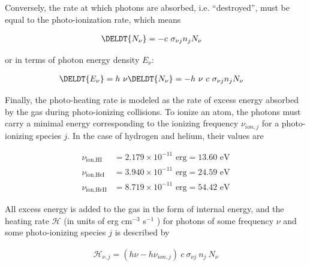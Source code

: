 Conversely, the rate at which photons are absorbed, i.e. ``destroyed'',  must be equal to the
photo-ionization rate, which means

\begin{align}
\DELDT{N_\nu} &= -c \ \sigma_{\nu j} n_j N_\nu
\end{align}

or in terms of photon energy density $E_\nu$:

\begin{align}
\DELDT{E_\nu} &= h \ \nu \DELDT{N_\nu}  = -h\ \nu \ c \ \sigma_{\nu j} n_j N_\nu
\end{align}



Finally, the photo-heating rate is modeled as the rate of excess energy absorbed by the gas during
photo-ionizing collisions. To ionize an atom, the photons must carry a minimal energy corresponding to the ionizing frequency  $\nu_{ion,j}$ for a photo-ionizing species $j$. In the case of hydrogen and helium, their values are

\begin{align}
    \nu_{\text{ion,HI}} &= 2.179 \times 10^{-11} \text{ erg} = 13.60 \text{ eV} \label{eq:nuIonHI}\\
    \nu_{\text{ion,HeI}} &= 3.940 \times 10^{-11} \text{ erg} = 24.59 \text{ eV}
\label{eq:nuIonHeI}\\
    \nu_{\text{ion,HeII}} &= 8.719 \times 10^{-11} \text{ erg} = 54.42 \text{ eV}
\label{eq:nuIonHeII}
\end{align}

All excess energy is added to the gas in the form of internal energy, and the heating rate
$\mathcal{H}$ (in units of erg cm$^{-3}$ s$^{-1}$ ) for photons of some frequency $\nu$ and some
photo-ionizing species $j$ is described by

\begin{align}
\mathcal{H}_{\nu, j} = (h \nu - h \nu_{ion,j}) \ c \ \sigma_{\nu j} \ n_j \ N_\nu
\end{align}

